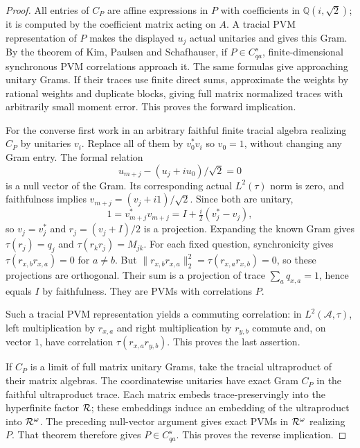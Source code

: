 \begin{proof}
All entries of $C_P$ are affine expressions in $P$ with coefficients in $\mathbb Q(i,\sqrt2)$; it is computed by the coefficient matrix acting on $A$. A tracial PVM representation of $P$ makes the displayed $u_j$ actual unitaries and gives this Gram. By the theorem of Kim, Paulsen and Schafhauser, if $P\in C_{qa}^s$, finite-dimensional synchronous PVM correlations approach it. The same formulas give approaching unitary Grams. If their traces use finite direct sums, approximate the weights by rational weights and duplicate blocks, giving full matrix normalized traces with arbitrarily small moment error. This proves the forward implication.

For the converse first work in an arbitrary faithful finite tracial algebra realizing $C_P$ by unitaries $v_i$. Replace all of them by $v_0^*v_i$ so $v_0=1$, without changing any Gram entry. The formal relation
\[
u_{m+j}-(u_j+i u_0)/\sqrt2=0
\]
is a null vector of the Gram. Its corresponding actual $L^2(\tau)$ norm is zero, and faithfulness implies
$v_{m+j}=(v_j+i1)/\sqrt2$. Since both are unitary,
\[
1=v_{m+j}^*v_{m+j}=I+\tfrac i2(v_j^*-v_j),
\]
so $v_j=v_j^*$ and $r_j=(v_j+I)/2$ is a projection. Expanding the known Gram gives $\tau(r_j)=q_j$ and $\tau(r_kr_j)=M_{jk}$. For each fixed question, synchronicity gives $\tau(r_{x,b}r_{x,a})=0$ for $a\ne b$. But $\|r_{x,b}r_{x,a}\|_2^2=\tau(r_{x,a}r_{x,b})=0$, so these projections are orthogonal. Their sum is a projection of trace $\sum_aq_{x,a}=1$, hence equals $I$ by faithfulness. They are PVMs with correlations $P$.

Such a tracial PVM representation yields a commuting correlation: in $L^2(\mathcal A,\tau)$, left multiplication by $r_{x,a}$ and right multiplication by $r_{y,b}$ commute and, on vector $1$, have correlation $\tau(r_{x,a}r_{y,b})$. This proves the last assertion.

If $C_P$ is a limit of full matrix unitary Grams, take the tracial ultraproduct of their matrix algebras. The coordinatewise unitaries have exact Gram $C_P$ in the faithful ultraproduct trace. Each matrix embeds trace-preservingly into the hyperfinite factor $\mathcal R$; these embeddings induce an embedding of the ultraproduct into $\mathcal R^\omega$. The preceding null-vector argument gives exact PVMs in $\mathcal R^\omega$ realizing $P$. That theorem therefore gives $P\in C_{qa}^s$. This proves the reverse implication.
\end{proof}

